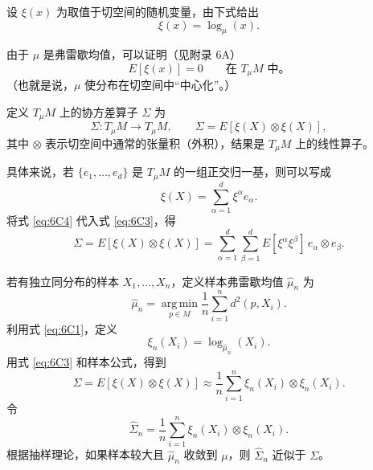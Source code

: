 设 $\xi(x)$ 为取值于切空间的随机变量，由下式给出
\begin{equation*}
  \xi(x)=\log_\mu(x).
  \tag{6C1}\label{eq:6C1}
\end{equation*}

由于 $\mu$ 是弗雷歇均值，可以证明（见附录 6A）%
%
\begin{equation*}
  E[\xi(x)]=0\qquad\text{在 $T_\mu M$ 中。}
  \tag{6C2}\label{eq:6C2}
\end{equation*}
（也就是说，$\mu$ 使分布在切空间中“中心化”。）

定义 $T_\mu M$ 上的协方差算子 $\Sigma$ 为
\begin{equation*}
  \Sigma\colon T_\mu M\to T_\mu M,\qquad
  \Sigma=E[\xi(X)\otimes\xi(X)],
  \tag{6C3}\label{eq:6C3}
\end{equation*}
其中 $\otimes$ 表示切空间中通常的张量积（外积），结果是 $T_\mu M$ 上的线性算子。

具体来说，若 $\{e_1,\dots,e_d\}$ 是 $T_\mu M$ 的一组正交归一基，则可以写成
\begin{equation*}
  \xi(X)=\sum_{\alpha=1}^d \xi^\alpha e_\alpha.
  \tag{6C4}\label{eq:6C4}
\end{equation*}
将式 \eqref{eq:6C4} 代入式 \eqref{eq:6C3}，得
\begin{equation*}
  \Sigma=E[\xi(X)\otimes\xi(X)]
     =\sum_{\alpha=1}^d\sum_{\beta=1}^dE[\xi^\alpha\xi^\beta]\,e_\alpha\otimes e_\beta.
  \tag{6C5}\label{eq:6C5}
\end{equation*}

若有独立同分布的样本 $X_1,\dots,X_n$，定义样本弗雷歇均值 $\hat\mu_n$ 为
\[
  \hat\mu_n=\operatorname*{arg\,min}_{p\in M}\frac1n\sum_{i=1}^nd^2(p,X_i).
\]
利用式 \eqref{eq:6C1}，定义
\begin{equation*}
  \xi_n(X_i)=\log_{\hat\mu_n}(X_i).
  \tag{6C6}\label{eq:6C6}
\end{equation*}
用式 \eqref{eq:6C3} 和样本公式，得到
\begin{equation*}
  \Sigma=E[\xi(X)\otimes\xi(X)]
    \approx\frac1n\sum_{i=1}^n\xi_n(X_i)\otimes\xi_n(X_i).
  \tag{6C7}\label{eq:6C7}
\end{equation*}
令
\begin{equation*}
  \hat\Sigma_n=\frac1n\sum_{i=1}^n\xi_n(X_i)\otimes\xi_n(X_i).
  \tag{6C8}\label{eq:6C8}
\end{equation*}
根据抽样理论，如果样本较大且 $\hat\mu_n$ 收敛到 $\mu$，则 $\hat\Sigma_n$ 近似于 $\Sigma$。%

